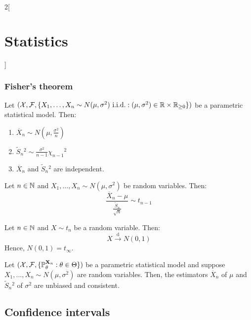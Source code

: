 \documentclass[../../../main.tex]{subfiles}
\begin{document}
\begin{multicols}{2}[\section{Statistics}]
  \subsubsection{Fisher's theorem}
  \begin{theorem}
    Let $(\mathcal{X},\mathcal{F},\{X_1,\ldots, \\X_n\sim N(\mu,\sigma^2)\text{ i.i.d.}:(\mu,\sigma^2)\in\mathbb{R}\times\mathbb{R}_{\geq 0}\})$ be a parametric statistical model. Then:
    \begin{enumerate}
      \item $\overline{X}_n\sim N\left(\mu,\frac{\sigma^2}{n}\right)$
      \item $\tilde{S}_n{}^2\sim\frac{\sigma^2}{n-1}{\chi_{n-1}}^2$
      \item $\overline{X}_n$ and $\tilde{S}_n{}^2$ are independent.
    \end{enumerate}
  \end{theorem}
  \begin{corollary}
    Let $n\in\mathbb{N}$ and $X_1,\ldots,X_n\sim N(\mu,\sigma^2)$ be \iid random variables. Then: $$\frac{\overline{X}_n-\mu}{\frac{\tilde{S}_n}{\sqrt{n}}}\sim t_{n-1}$$
  \end{corollary}
  \begin{corollary}
    Let $n\in\mathbb{N}$ and $X\sim t_n$ be a random variable. Then: $$X\overset{\text{d}}{\longrightarrow }N\left(0,1\right)$$
    Hence, $N(0,1)=t_\infty$.
  \end{corollary}
  \begin{corollary}
    Let $(\mathcal{X},\mathcal{F},\{\mathbb{P}_\theta^{\boldsymbol{\mathrm{X}}_n}:\theta\in\Theta\})$ be a parametric statistical model and suppose $X_1,\ldots,X_n\sim N(\mu,\sigma^2)$ are \iid random variables. Then, the estimators $\overline{X}_n$ of $\mu$ and $\tilde{S}_n{}^2$ of $\sigma^2$ are unbiased and consistent.
  \end{corollary}
  \begin{center}
    \begin{minipage}{\linewidth}
      \centering
      
    \end{minipage}
  \end{center}
  \subsection{Confidence intervals}

\end{multicols}
\end{document}
